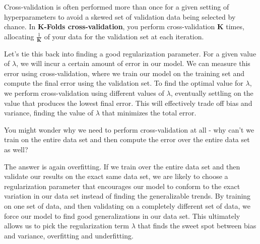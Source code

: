 Cross-validation is often performed more than once for a given setting of hyperparameters to avoid a skewed set of validation data being selected by chance. In \textbf{K-Folds cross-validation}, you perform cross-validation \textbf{K} times, allocating $\frac{1}{\textbf{K}}$ of your data for the validation set at each iteration.

Let's tie this back into finding a good regularization parameter. For a given value of $\lambda$, we will incur a certain amount of error in our model. We can measure this error using cross-validation, where we train our model on the training set and compute the final error using the validation set. To find the optimal value for $\lambda$, we perform cross-validation using different values of $\lambda$, eventually settling on the value that produces the lowest final error. This will effectively trade off bias and variance, finding the value of $\lambda$ that minimizes the total error.

You might wonder why we need to perform cross-validation at all - why can't we train on the entire data set and then compute the error over the entire data set as well?

The answer is again overfitting. If we train over the entire data set and then validate our results on the exact same data set, we are likely to choose a regularization parameter that encourages our model to conform to the exact variation in our data set instead of finding the generalizable trends. By training on one set of data, and then validating on a completely different set of data, we force our model to find good generalizations in our data set. This ultimately allows us to pick the regularization term $\lambda$ that finds the sweet spot between bias and variance, overfitting and underfitting.

